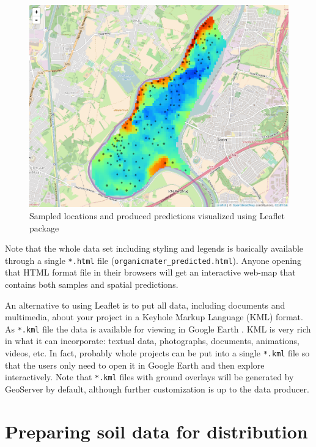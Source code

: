 \documentclass[10pt,b5paper,]{book}
\theoremstyle{definition}
\theoremstyle{definition}
\theoremstyle{definition}
\theoremstyle{remark}
\begin{document}
\begin{figure}
\centering
\includegraphics{images/Data_sharing_Leaflet.png}
\caption{Sampled locations and produced predictions visualized using
Leaflet package}
\end{figure}

Note that the whole data set including styling and legends is basically
available through a single \texttt{*.html} file
(\texttt{organicmater\_predicted.html}). Anyone opening that HTML format
file in their browsers will get an interactive web-map that contains
both samples and spatial predictions.

An alternative to using Leaflet is to put all data, including documents
and multimedia, about your project in a Keyhole Markup Language (KML)
format. As \texttt{*.kml} file the data is available for viewing in
Google Earth \citep{hengl2015plotkml}. KML is very rich in what it can
incorporate: textual data, photographs, documents, animations, videos,
etc. In fact, probably whole projects can be put into a single
\texttt{*.kml} file so that the users only need to open it in Google
Earth and then explore interactively. Note that \texttt{*.kml} files
with ground overlays will be generated by GeoServer by default, although
further customization is up to the data producer.

\hypertarget{preparing-soil-data-for-distribution}{%
\section{Preparing soil data for
distribution}\label{preparing-soil-data-for-distribution}}
\end{document}
